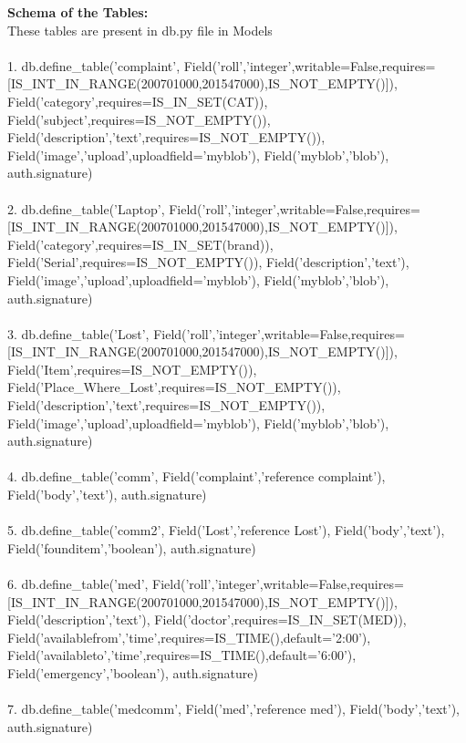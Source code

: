 \documentclass[a4paper,11pt]{article}
\begin{document}
{\Large{\bfseries Schema of the Tables:}
	\newline
	\\
These tables are present in db.py file in Models}
\\
\\
1. db.define\_table('complaint',
Field('roll','integer',writable=False,requires=[IS\_INT\_IN\_RANGE(200701000,201547000),IS\_NOT\_EMPTY()]),
Field('category',requires=IS\_IN\_SET(CAT)),
Field('subject',requires=IS\_NOT\_EMPTY()),
Field('description','text',requires=IS\_NOT\_EMPTY()),
Field('image','upload',uploadfield='myblob'),
Field('myblob','blob'),
auth.signature)
\\
\\
2. db.define\_table('Laptop',
Field('roll','integer',writable=False,requires=[IS\_INT\_IN\_RANGE(200701000,201547000),IS\_NOT\_EMPTY()]),
Field('category',requires=IS\_IN\_SET(brand)),
Field('Serial',requires=IS\_NOT\_EMPTY()),
Field('description','text'),
Field('image','upload',uploadfield='myblob'),
Field('myblob','blob'),
auth.signature)
\\
\\
3. db.define\_table('Lost',
Field('roll','integer',writable=False,requires=[IS\_INT\_IN\_RANGE(200701000,201547000),IS\_NOT\_EMPTY()]),
Field('Item',requires=IS\_NOT\_EMPTY()),
Field('Place\_Where\_Lost',requires=IS\_NOT\_EMPTY()),
Field('description','text',requires=IS\_NOT\_EMPTY()),
Field('image','upload',uploadfield='myblob'),
Field('myblob','blob'),
auth.signature)
\\
\\
4. db.define\_table('comm',
Field('complaint','reference complaint'),
Field('body','text'),
auth.signature)
\\
\\
5. db.define\_table('comm2',
Field('Lost','reference Lost'),
Field('body','text'),
Field('founditem','boolean'),
auth.signature)
\\
\\
6. db.define\_table('med',
Field('roll','integer',writable=False,requires=[IS\_INT\_IN\_RANGE(200701000,201547000),IS\_NOT\_EMPTY()]),
Field('description','text'),
Field('doctor',requires=IS\_IN\_SET(MED)),
Field('availablefrom','time',requires=IS\_TIME(),default='2:00'),
Field('availableto','time',requires=IS\_TIME(),default='6:00'),
Field('emergency','boolean'),
auth.signature)
\\
\\
7. db.define\_table('medcomm',
Field('med','reference med'),
Field('body','text'),
auth.signature)
\\
\end{document}
